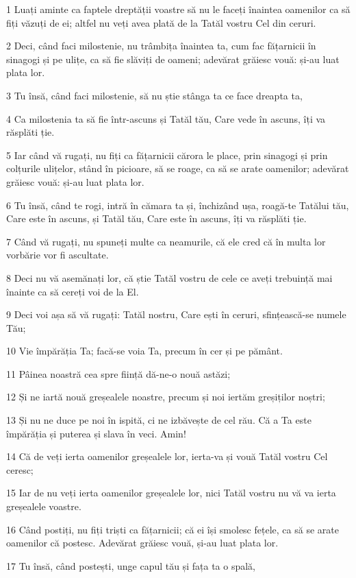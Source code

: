 \par 1 Luați aminte ca faptele dreptății voastre să nu le faceți înaintea oamenilor ca să fiți văzuți de ei; altfel nu veți avea plată de la Tatăl vostru Cel din ceruri.
\par 2 Deci, când faci milostenie, nu trâmbița înaintea ta, cum fac fățarnicii în sinagogi și pe ulițe, ca să fie slăviți de oameni; adevărat grăiesc vouă: și-au luat plata lor.
\par 3 Tu însă, când faci milostenie, să nu știe stânga ta ce face dreapta ta,
\par 4 Ca milostenia ta să fie într-ascuns și Tatăl tău, Care vede în ascuns, îți va răsplăti ție.
\par 5 Iar când vă rugați, nu fiți ca fățarnicii cărora le place, prin sinagogi și prin colțurile ulițelor, stând în picioare, să se roage, ca să se arate oamenilor; adevărat grăiesc vouă: și-au luat plata lor.
\par 6 Tu însă, când te rogi, intră în cămara ta și, închizând ușa, roagă-te Tatălui tău, Care este în ascuns, și Tatăl tău, Care este în ascuns, îți va răsplăti ție.
\par 7 Când vă rugați, nu spuneți multe ca neamurile, că ele cred că în multa lor vorbărie vor fi ascultate.
\par 8 Deci nu vă asemănați lor, că știe Tatăl vostru de cele ce aveți trebuință mai înainte ca să cereți voi de la El.
\par 9 Deci voi așa să vă rugați: Tatăl nostru, Care ești în ceruri, sfințească-se numele Tău;
\par 10 Vie împărăția Ta; facă-se voia Ta, precum în cer și pe pământ.
\par 11 Pâinea noastră cea spre ființă dă-ne-o nouă astăzi;
\par 12 Și ne iartă nouă greșealele noastre, precum și noi iertăm greșiților noștri;
\par 13 Și nu ne duce pe noi în ispită, ci ne izbăvește de cel rău. Că a Ta este împărăția și puterea și slava în veci. Amin!
\par 14 Că de veți ierta oamenilor greșealele lor, ierta-va și vouă Tatăl vostru Cel ceresc;
\par 15 Iar de nu veți ierta oamenilor greșealele lor, nici Tatăl vostru nu vă va ierta greșealele voastre.
\par 16 Când postiți, nu fiți triști ca fățarnicii; că ei își smolesc fețele, ca să se arate oamenilor că postesc. Adevărat grăiesc vouă, și-au luat plata lor.
\par 17 Tu însă, când postești, unge capul tău și fața ta o spală,

